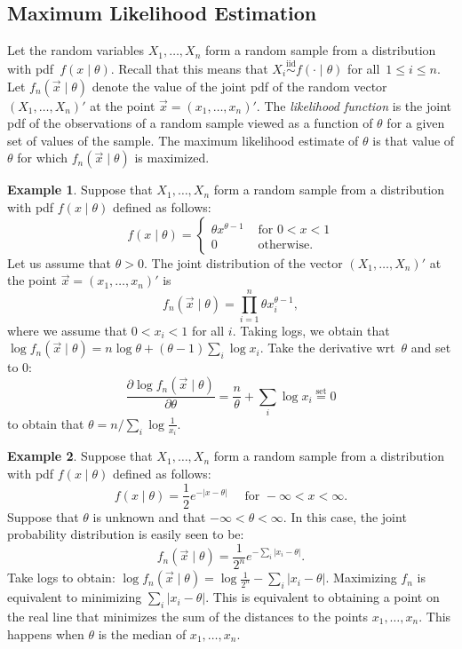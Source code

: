 \documentclass[11pt,a4]{article}
\newcommand{\set}{\ensuremath{\stackrel{\text{set}}{=}}}
\newcommand{\iid}{\ensuremath{\stackrel{\text{iid}}{\sim}}}
\theoremstyle{definition}
\newtheorem{example}{Example}
\begin{document}
\subsection{Maximum Likelihood Estimation}
Let the random variables $X_1, \ldots, X_n$ form a random sample from a 
distribution with pdf~$f(x \mid \theta)$. Recall that this means that 
$X_i \iid f( \cdot \mid \theta)$ for all~$1 \leq i \leq n$. 
Let $f_n(\vec{x} \mid \theta)$ denote the value of the joint pdf of 
the random vector $(X_1, \ldots, X_n)'$ at the point 
$\vec{x} = (x_1, \ldots, x_n)'$. The \emph{likelihood function} is the joint pdf 
of the observations of a random sample viewed as a function of $\theta$ for 
a given set of values of the sample. The maximum likelihood estimate of 
$\theta$ is that value of $\theta$ for which $f_n (\vec{x} \mid \theta)$ is 
maximized. 
\begin{example}
Suppose that $X_1, \ldots, X_n$ form a random sample from a distribution with 
pdf $f(x \mid \theta)$ defined as follows:
\[
    f(x \mid \theta) = 
        \left \{
            \begin{array}{ll}
                \theta x^{\theta - 1} & \text{ for } 0 < x < 1 \\
                0                     & \text{ otherwise}.
            \end{array} 
        \right .
\]
Let us assume that $\theta > 0$. The joint distribution of the vector 
$(X_1, \ldots, X_n)'$ at the point $\vec{x} = (x_1, \ldots, x_n)'$ is 
\[
    f_n (\vec{x} \mid \theta ) = \prod_{i = 1}^n \theta x_i^{\theta - 1},
\]
where we assume that $0 < x_i < 1$ for all $i$. Taking logs, we obtain that
$\log f_n (\vec{x} \mid \theta) = n \log \theta + (\theta - 1) \sum_i \log x_i$. 
Take the derivative wrt~$\theta$ and set to $0$:
\[
    \frac{\partial \log f_n (\vec{x} \mid \theta)}{\partial \theta} = 
        \frac{n}{\theta} + \sum_i \log x_i \set 0
\]
to obtain that $\theta = n / \sum_i \log \frac{1}{x_i}$.
\end{example}   

\begin{example}
Suppose that $X_1, \ldots, X_n$ form a random sample from a distribution with 
pdf $f(x \mid \theta)$ defined as follows:
\[
    f(x \mid \theta) = \frac{1}{2} e^{- |x - \theta|} 
        \quad \text{ for } -\infty < x < \infty.
\]
Suppose that $\theta$ is unknown and that $-\infty < \theta < \infty$. 
In this case, the joint probability distribution is easily seen to be:
\[
    f_n(\vec{x} \mid \theta) = \frac{1}{2^n} e^{- \sum_i |x_i - \theta|}.
\]
Take logs to obtain: 
$\log f_n (\vec{x} \mid \theta) = \log \frac{1}{2^n} - \sum_i |x_i - \theta|$. 
Maximizing $f_n$ is equivalent to minimizing $\sum_i |x_i - \theta|$. This 
is equivalent to obtaining a point on the real line that minimizes the sum 
of the distances to the points $x_1, \ldots, x_n$. This happens when $\theta$
is the median of $x_1, \ldots, x_n$.
\end{example}
\end{document}
